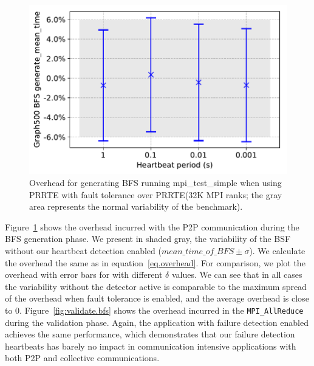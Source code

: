 \documentclass[5p,times,twocolumn]{elsarticle}
\newcommand{\mpifunc}[1]{\lstinline"MPI_#1"\xspace}
\newcommand{\prrte}[0]{\textsc{PRRTE}\xspace}
\newcommand{\mpi}[0]{\textsc{MPI}\xspace}
\begin{document}
\begin{figure}[h]
  \centering
  \includegraphics[width=\linewidth]{bfs_mean.pdf}
  \caption{Overhead for generating BFS running mpi\_test\_simple when using \prrte with fault tolerance over \prrte (32K \mpi ranks; the gray area represents the normal variability of the benchmark).}
  \label{fig:mean.bfs}
\end{figure}

Figure~\ref{fig:mean.bfs} shows the overhead incurred with the P2P communication during the BFS generation phase.
We present in shaded gray, the variability of the BSF without our heartbeat detection enabled ($mean\_time\_of\_BFS \pm \sigma$).
We calculate the overhead the same as in equation~\eqref{eq.overhead}. For comparison, we plot the overhead with error bars for with different $\delta$ values.
We can see that in all cases the variability without the detector active is comparable to the maximum spread of the overhead when fault tolerance is enabled, and the average overhead is close to 0.
Figure~\ref{fig:validate.bfs} shows the overhead incurred in the \mpifunc{AllReduce} during the validation phase.
Again, the application with failure detection enabled achieves the same performance, which demonstrates that our failure detection heartbeats has barely no impact in communication intensive applications with both P2P and collective communications.
\end{document}
